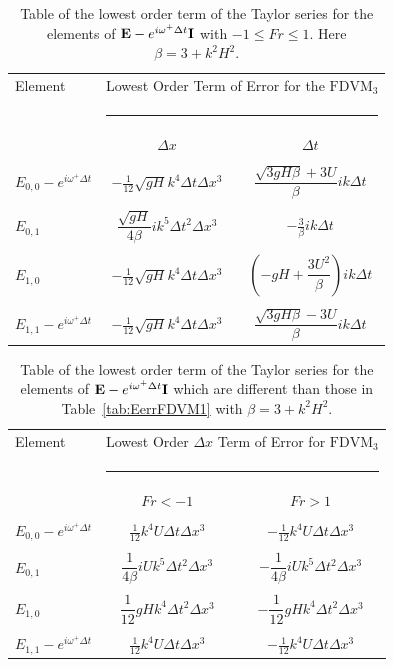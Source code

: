 \begin{table}
	\begin{tabular}{l  c c}
	\hline
		Element & \multicolumn{2}{c}{Lowest Order Term of Error for the $\text{FDVM}_3$}\\
		&  \multicolumn{2}{l}{\rule{0.7\textwidth}{0.4pt}} \\
		& $\Delta x$&$\Delta t$\\
		\hline && \\
		$E_{0,0} -  e^{i \omega^+ \Delta t} $& $ - \frac{1}{12} \sqrt{gH} k^4 \Delta t\Delta x^3$ & $\dfrac{\sqrt{3gH \beta} + 3U}{\beta} ik \Delta t$ \\ & & \\
		$E_{0,1}$& $ \dfrac{\sqrt{gH}}{4 \beta}i k^5\Delta  t ^2\Delta x^3$ &  $ - \frac{3}{\beta} ik\Delta t$ \\ & & \\
		$E_{1,0}$& $ - \frac{1}{12} \sqrt{gH} k^4 \Delta t\Delta x^3$ &  $ \left(-gH + \dfrac{3U^2}{\beta}\right)ik \Delta t$ \\ & & \\
		$E_{1,1} -  e^{i \omega^+ \Delta t}$& $ - \frac{1}{12} \sqrt{gH} k^4 \Delta t\Delta x^3$ & $\dfrac{\sqrt{3gH \beta} - 3U}{\beta} ik \Delta t$ \\  \hline
	\end{tabular}
	\caption{Table of the lowest order term of the Taylor series for the elements of $\mathbf{E} - e^{i \omega^+ \Delta t} \mathbf{I}$ with $ -1 \le Fr \le 1$. Here $\beta = 3 + k^2 H^2$.}
	\label{tab:EerrFDVM3} 
\end{table}

\begin{table}
	\begin{tabular}{l  c  c}
	\hline
		Element &\multicolumn{2}{c}{Lowest Order $\Delta x$ Term of Error for $\text{FDVM}_3$}\\
		&  \multicolumn{2}{l}{\rule{0.7\textwidth}{0.4pt}} \\
		& $Fr < - 1$&$ Fr >1$\\
		\hline & \\
		$E_{0,0} -  e^{i \omega^+ \Delta t} $& $\frac{1}{12} k^4 U \Delta t \Delta x^3$ &  $ -\frac{1}{12} k^4 U \Delta t \Delta x^3$ \\  &  \\
		$E_{0,1}$& $\dfrac{1}{4 \beta}iUk^5 \Delta t^2 \Delta x^3 $ & $-\dfrac{1}{4 \beta}iUk^5 \Delta t^2 \Delta x^3 $   \\  &  \\
		$E_{1,0}$& $\dfrac{1}{12} gHk^4 \Delta t^2 \Delta x^3 $ & $-\dfrac{1}{12} gHk^4 \Delta t^2 \Delta x^3 $  \\  &  \\
		$E_{1,1} -  e^{i \omega^+ \Delta t}$& $ \frac{1}{12} k^4 U \Delta t \Delta x^3$ & $ -\frac{1}{12} k^4 U \Delta t \Delta x^3$   \\ \hline
	\end{tabular}
	\caption{Table of the lowest order term of the Taylor series for the elements of $\mathbf{E} - e^{i \omega^+ \Delta t} \mathbf{I}$ which are different than those in Table~\ref{tab:EerrFDVM1} with  $\beta = 3 + k^2 H^2$. }
	\label{tab:EerrFDVM3super} 
\end{table}

